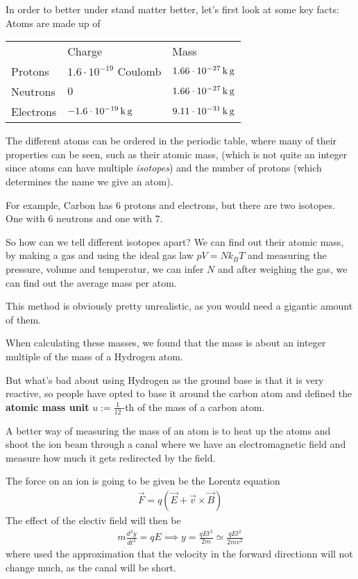 In order to better under stand matter better, let's first look at some key facts: Atoms are made up of
\begin{tabular}{lll}
	& Charge & Mass\\
	Protons & $1.6 \cdot 10^{-19}$ Coulomb & $1.66 \cdot 10^{-27}\kilo\gram$\\
	Neutrons & $0$ & $1.66 \cdot 10^{-27}\kilo\gram$\\
	Electrons & $-1.6 \cdot 10^{-19}\kilo\gram$ & $9.11 \cdot 10^{-31}\kilo\gram$
\end{tabular}

The different atoms can be ordered in the periodic table, where many of their properties can be seen, such as their atomic mass, (which is not quite an integer since atoms can have multiple \emph{isotopes}) and the number of protons (which determines the name we give an atom).

For example, Carbon has $6$ protons and electrons, but there are two isotopes. One with $6$ neutrons and one with $7$.

So how can we tell different isotopes apart? We can find out their atomic mass, by making a gas and using the ideal gas law $pV = Nk_B T$ and measuring the pressure, volume and temperatur, we can infer $N$ and after weighing the gas, we can find out the average mass per atom.

This method is obviously pretty unrealistic, as you would need a gigantic amount of them.

When calculating these masses, we found that the mass is about an integer multiple of the mass of a Hydrogen atom.

But what's bad about using Hydrogen as the ground base is that it is very reactive, so people have opted to base it around the carbon atom and defined the \textbf{atomic mass unit} $u := \frac{1}{12}$-th of the mass of a carbon atom.


A better way of measuring the mass of an atom is to heat up the atoms and shoot the ion beam through a canal where we have an electromagnetic field and measure how much it gets redirected by the field.

The force on an ion is going to be given be the Lorentz equation
\begin{align*}
	\vec{F} = q(\vec{E} + \vec{v} \times \vec{B})
\end{align*}
The effect of the electiv field will then be
\begin{align*}
	m \frac{d^2 y}{d t^2} = qE \implies y = \frac{q E t^2}{2m} \simeq \frac{qEl^2}{2mv^2}
\end{align*}
where used the approximation that the velocity in the forward directionn will not change much, as the canal will be short.

